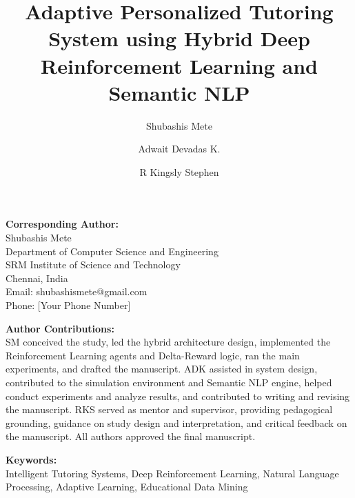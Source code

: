 \documentclass[12pt]{article}
\title{\textbf{Adaptive Personalized Tutoring System using Hybrid Deep Reinforcement Learning and Semantic NLP}}
\author[1]{Shubashis Mete}
\author[1]{Adwait Devadas K.}
\author[1]{R Kingsly Stephen}
\affil[1]{Department of Computer Science and Engineering, SRM Institute of Science and Technology, Chennai, India}
\date{}
\begin{document}
\maketitle

\vspace{2cm}

\textbf{Corresponding Author:} \\
Shubashis Mete \\
Department of Computer Science and Engineering \\
SRM Institute of Science and Technology \\
Chennai, India \\
Email: shubashismete@gmail.com \\
Phone: [Your Phone Number]

\vspace{1cm}

\textbf{Author Contributions:} \\
SM conceived the study, led the hybrid architecture design, implemented the Reinforcement Learning agents and Delta-Reward logic, ran the main experiments, and drafted the manuscript. ADK assisted in system design, contributed to the simulation environment and Semantic NLP engine, helped conduct experiments and analyze results, and contributed to writing and revising the manuscript. RKS served as mentor and supervisor, providing pedagogical grounding, guidance on study design and interpretation, and critical feedback on the manuscript. All authors approved the final manuscript.

\vspace{1cm}

\textbf{Keywords:} \\
Intelligent Tutoring Systems, Deep Reinforcement Learning, Natural Language Processing, Adaptive Learning, Educational Data Mining
\end{document}
